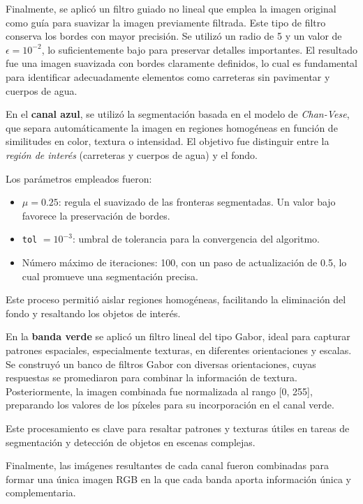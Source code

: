 Finalmente, se aplicó un filtro guiado no lineal que emplea la imagen original como guía para suavizar la imagen previamente filtrada. Este tipo de filtro conserva los bordes con mayor precisión. Se utilizó un radio de 5 y un valor de $\epsilon = 10^{-2}$, lo suficientemente bajo para preservar detalles importantes. El resultado fue una imagen suavizada con bordes claramente definidos, lo cual es fundamental para identificar adecuadamente elementos como carreteras sin pavimentar y cuerpos de agua.

En el \textbf{canal azul}, se utilizó la segmentación basada en el modelo de \textit{Chan-Vese}, que separa automáticamente la imagen en regiones homogéneas en función de similitudes en color, textura o intensidad. El objetivo fue distinguir entre la \textit{región de interés} (carreteras y cuerpos de agua) y el fondo. 

Los parámetros empleados fueron:

\begin{itemize}
    \item $\mu = 0.25$: regula el suavizado de las fronteras segmentadas. Un valor bajo favorece la preservación de bordes.
    \item \texttt{tol} $= 10^{-3}$: umbral de tolerancia para la convergencia del algoritmo.
    \item Número máximo de iteraciones: 100, con un paso de actualización de 0.5, lo cual promueve una segmentación precisa.
\end{itemize}

Este proceso permitió aislar regiones homogéneas, facilitando la eliminación del fondo y resaltando los objetos de interés.

En la \textbf{banda verde} se aplicó un filtro lineal del tipo Gabor, ideal para capturar patrones espaciales, especialmente texturas, en diferentes orientaciones y escalas. Se construyó un banco de filtros Gabor con diversas orientaciones, cuyas respuestas se promediaron para combinar la información de textura. Posteriormente, la imagen combinada fue normalizada al rango [0, 255], preparando los valores de los píxeles para su incorporación en el canal verde.

Este procesamiento es clave para resaltar patrones y texturas útiles en tareas de segmentación y detección de objetos en escenas complejas.

Finalmente, las imágenes resultantes de cada canal fueron combinadas para formar una única imagen RGB en la que cada banda aporta información única y complementaria.

